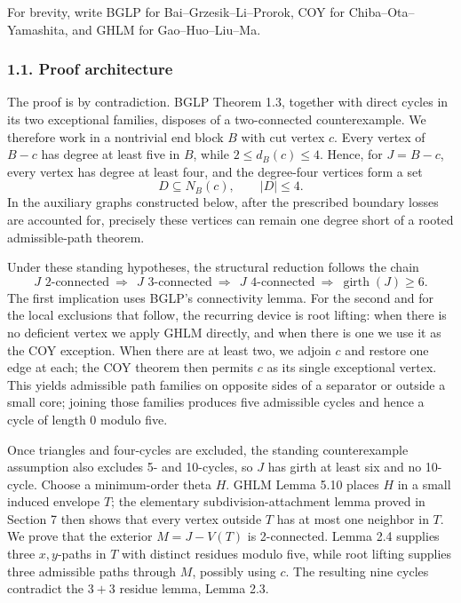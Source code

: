 \documentclass[
  11pt]{article}
\let\papersubsection\subsubsection
\renewcommand{\subsubsection}{\Needspace{7\baselineskip}\papersubsection}
\begin{document}
For brevity, write BGLP for Bai--Grzesik--Li--Prorok, COY for
Chiba--Ota--Yamashita, and GHLM for Gao--Huo--Liu--Ma.

\subsubsection{1.1. Proof architecture}\label{proof-architecture}

The proof is by contradiction. BGLP Theorem 1.3, together with direct
cycles in its two exceptional families, disposes of a two-connected
counterexample. We therefore work in a nontrivial end block \(B\) with
cut vertex \(c\). Every vertex of \(B-c\) has degree at least five in
\(B\), while \(2\le d_B(c)\le4\). Hence, for \(J=B-c\), every vertex has
degree at least four, and the degree-four vertices form a set \[
 D\subseteq N_B(c),\qquad |D|\le4.
\] In the auxiliary graphs constructed below, after the prescribed
boundary losses are accounted for, precisely these vertices can remain
one degree short of a rooted admissible-path theorem.

Under these standing hypotheses, the structural reduction follows the
chain \[
 J\text{ 2-connected}
 \ \Longrightarrow\ \ J\text{ 3-connected}
 \ \Longrightarrow\ \ J\text{ 4-connected}
 \ \Longrightarrow\ \operatorname{girth}(J)\ge6.
\] The first implication uses BGLP's connectivity lemma. For the second
and for the local exclusions that follow, the recurring device is root
lifting: when there is no deficient vertex we apply GHLM directly, and
when there is one we use it as the COY exception. When there are at
least two, we adjoin \(c\) and restore one edge at each; the COY theorem
then permits \(c\) as its single exceptional vertex. This yields
admissible path families on opposite sides of a separator or outside a
small core; joining those families produces five admissible cycles and
hence a cycle of length \(0\) modulo five.

Once triangles and four-cycles are excluded, the standing counterexample
assumption also excludes 5- and 10-cycles, so \(J\) has girth at least
six and no 10-cycle. Choose a minimum-order theta \(H\). GHLM Lemma 5.10
places \(H\) in a small induced envelope \(T\); the elementary
subdivision-attachment lemma proved in Section 7 then shows that every
vertex outside \(T\) has at most one neighbor in \(T\). We prove that
the exterior \(M=J-V(T)\) is 2-connected. Lemma 2.4 supplies three
\(x,y\)-paths in \(T\) with distinct residues modulo five, while root
lifting supplies three admissible paths through \(M\), possibly using
\(c\). The resulting nine cycles contradict the \(3+3\) residue lemma,
Lemma 2.3.
\end{document}
